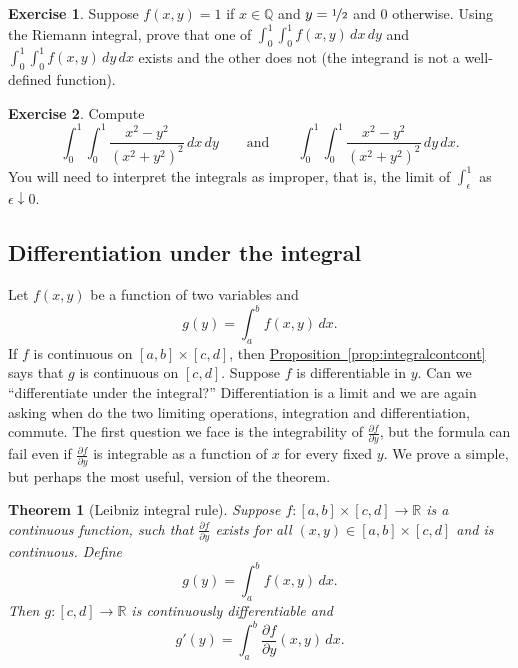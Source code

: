 \documentclass[12pt,openany]{book}
\newcommand{\R}{{\mathbb{R}}}
\newcommand{\Q}{{\mathbb{Q}}}
\newcommand{\myindex}[1]{#1\index{#1}}
\newcommand{\myquote}[1]{``#1''}
\theoremstyle{plain}
\newtheorem{thm}{Theorem}[section]
\theoremstyle{remark}
\theoremstyle{definition}
\newenvironment{exbox}{%
    \def\FrameCommand{\vrule width 1pt \relax\hspace{10pt}}%
    \MakeFramed{\advance\hsize-\width\FrameRestore}%
}{%
    \endMakeFramed
}
\theoremstyle{exercise}
\newtheorem{exercise}{Exercise}[section]
\theoremstyle{example}
\newcommand{\propref}[1]{\hyperref[#1]{Proposition~\ref*{#1}}}
\begin{document}
\begin{exbox}
\begin{exercise}
Suppose $f(x,y) = 1$ if $x \in \Q$ and $y=\nicefrac{1}{2}$ and $0$ otherwise.
Using the Riemann integral, prove that one of
$\int_0^1 \int_0^1 f(x,y) \, dx \, dy$ and
$\int_0^1 \int_0^1 f(x,y) \, dy \, dx$ exists and the other does not (the
integrand is not a well-defined function).
\end{exercise}

\begin{exercise}
Compute
\begin{equation*}
\int_0^1 \int_0^1 \frac{x^2-y^2}{{(x^2+y^2)}^2} \, dx \, dy
\qquad \text{and} \qquad
\int_0^1 \int_0^1 \frac{x^2-y^2}{{(x^2+y^2)}^2} \, dy \, dx .
\end{equation*}
You will need to interpret the integrals as improper, that
is, the limit of $\int_\epsilon^1$ as $\epsilon \downarrow 0$.
\end{exercise}
\end{exbox}

\subsection{Differentiation under the integral}
\label{subsec:diffunderint}

Let $f(x,y)$ be a function of two variables and
\begin{equation*}
g(y) = \int_a^b f(x,y) \,dx .
\end{equation*}
If $f$ is continuous on $[a,b] \times [c,d]$, then
\propref{prop:integralcontcont}
says that $g$ is continuous on $[c,d]$.
Suppose $f$ is differentiable in $y$.
Can we \myquote{differentiate under the integral?}
Differentiation is a limit and we are again asking when do the
two limiting operations, integration and differentiation, commute.
The first
question we face is the integrability of
$\frac{\partial f}{\partial y}$, but the formula can fail even if
$\frac{\partial f}{\partial y}$ is integrable as a function of $x$ for every
fixed $y$.
We prove a simple, but perhaps the most useful, version of the theorem.

\begin{thm}[\myindex{Leibniz integral rule}]
\label{thm:Leibnizrule}
Suppose $f \colon [a,b] \times [c,d] \to \R$ is a continuous function,
such that $\frac{\partial f}{\partial y}$ exists for all $(x,y) \in [a,b]
\times [c,d]$ and is continuous.  Define
\begin{equation*}
g(y) = \int_a^b f(x,y) \,dx .
\end{equation*}
Then $g \colon [c,d] \to \R$ is continuously differentiable and
\begin{equation*}
g'(y) = \int_a^b \frac{\partial f}{\partial y}(x,y) \,dx .
\end{equation*}
\end{thm}
\end{document}
